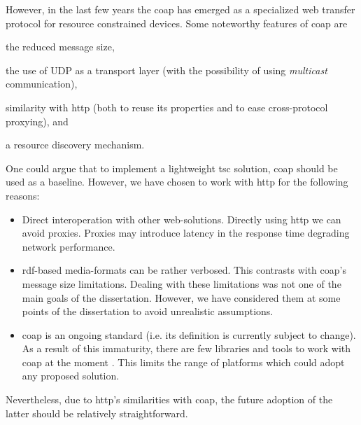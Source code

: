 However, in the last few years the \acf{coap}  has emerged as a specialized web transfer protocol for resource constrained devices. %
Some noteworthy features of \ac{coap} are
\begin{enumerate*}[label=\itshape(\arabic*\upshape)]
  \item the reduced message size,
  \item the use of UDP as a transport layer (with the possibility of using \emph{multicast} communication),
  \item similarity with \ac{http} (both to reuse its properties and to ease cross-protocol proxying), and
  \item a resource discovery mechanism. %
\end{enumerate*}


One could argue that to implement a lightweight \ac{tsc} solution, \ac{coap} should be used as a baseline.
However, we have chosen to work with \ac{http} for the following reasons:
\begin{itemize}
  \item Direct interoperation with other web-solutions.
        Directly using \ac{http} we can avoid proxies.
        Proxies may introduce latency in the response time degrading network performance. %
  \item \ac{rdf}-based media-formats can be rather verbosed.
	This contrasts with \ac{coap}'s message size limitations.
	Dealing with these limitations was not one of the main goals of the dissertation.
	However, we have considered them at some points of the dissertation to avoid unrealistic assumptions.
  \item \ac{coap} is an ongoing standard (i.e. its definition is currently subject to change).
        As a result of this immaturity, there are few libraries and tools to work with \ac{coap} at the moment \citep{villaverde_constrained_2012}. %
        This limits the range of platforms which could adopt any proposed solution. %
\end{itemize}


Nevertheless, due to \ac{http}'s similarities with \ac{coap}, the future adoption of the latter should be relatively straightforward.


